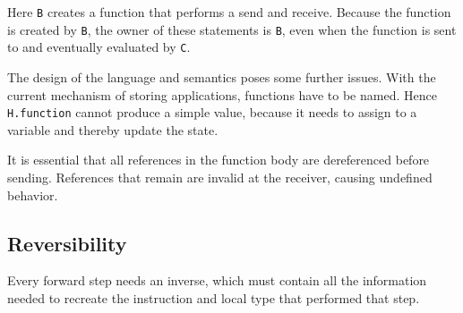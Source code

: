 \documentclass[runningheads]{llncs}
\begin{document}
Here \texttt{B} creates a function that performs a send and receive.
Because the function is created by \texttt{B}, the owner of these
statements is \texttt{B}, even when the function is sent to and
eventually evaluated by \texttt{C}.

The design of the language and semantics poses some further issues. With
the current mechanism of storing applications, functions have to be
named. Hence \texttt{H.function} cannot produce a simple value, because
it needs to assign to a variable and thereby update the state.

It is essential that all references in the function body are dereferenced
before sending. References that remain are invalid at the receiver,
causing undefined behavior.

\subsection{Reversibility}\label{reversibility}

Every forward step needs an inverse, which must contain all
the information needed to recreate the instruction and local type that
performed that step.
\end{document}
